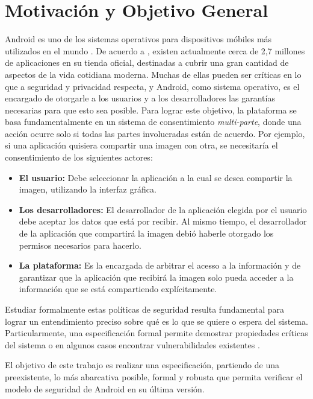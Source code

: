 \section{Motivación y Objetivo General}

Android es uno de los sistemas operativos para dispositivos móbiles más
utilizados en el mundo \cite{1,2}. De acuerdo a \cite{3}, existen actualmente
cerca de 2,7 millones de aplicaciones en su tienda oficial, destinadas a cubrir
una gran cantidad de aspectos de la vida cotidiana moderna. Muchas de ellas
pueden ser críticas en lo que a seguridad y privacidad respecta, y Android, como
sistema operativo, es el encargado de otorgarle a los usuarios y a los
desarrolladores las garantías necesarias para que esto sea posible. Para lograr
este objetivo, la plataforma se basa fundamentalmente en un sistema de
consentimiento \textit{multi-parte}, donde una acción ocurre solo si todas las
partes involucradas están de acuerdo. Por ejemplo, si una aplicación quisiera
compartir una imagen con otra, se necesitaría el consentimiento de los
siguientes actores:

\begin{itemize}
   \item \textbf{El usuario: } Debe seleccionar la aplicación a la cual se desea
   compartir la imagen, utilizando la interfaz gráfica.
   \item \textbf{Los desarrolladores: } El desarrollador de la aplicación
   elegida por el usuario debe aceptar los datos que está por recibir. Al mismo
   tiempo, el desarrollador de la aplicación que compartirá la imagen debió
   haberle otorgado los permisos necesarios para hacerlo.
   \item \textbf{La plataforma: } Es la encargada de arbitrar el acesso a la
   información y de garantizar que la aplicación que recibirá la imagen solo pueda
   acceder a la información que se está compartiendo explícitamente.
\end{itemize}


Estudiar formalmente estas políticas de seguridad resulta fundamental para
lograr un entendimiento preciso sobre qué es lo que se quiere o espera del
sistema. Particularmente, una especificación formal permite demostrar
propiedades críticas del sistema o en algunos casos encontrar vulnerabilidades
existentes \cite{alloy}.

El objetivo de este trabajo es realizar una especificación, partiendo de una
preexistente, lo más abarcativa posible, formal y robusta que permita verificar
el modelo de seguridad de Android en su última versión.
